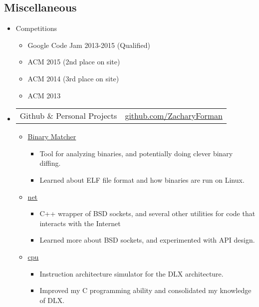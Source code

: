 \documentclass[10pt,letterpaper]{article}
\makeatletter
\newcommand{\headerrow}[2]
{\begin{tabular*}{\linewidth}{l@{\extracolsep{\fill}}r}
  #1 &
  #2 \\
\end{tabular*}}
\makeatother
\begin{document}
\subsection*{Miscellaneous}
\begin{itemize}
  \item Competitions
    \begin{itemize}
      \item Google Code Jam 2013-2015 (Qualified)
      \item ACM 2015 (2nd place on site)
      \item ACM 2014 (3rd place on site)
      \item ACM 2013
    \end{itemize}
  \item
  \headerrow
    {Github \& Personal Projects}
    {\href{https://www.github.com/ZacharyForman}{github.com/ZacharyForman}}
    \begin{itemize}
      \item \href{https://github.com/ZacharyForman/Binary_Matcher}{Binary Matcher}
        \begin{itemize}
          \item Tool for analyzing binaries, and potentially doing clever
                binary diffing.
          \item Learned about ELF file format and how binaries are run on Linux.
        \end{itemize}
      \item \href{https://github.com/ZacharyForman/net}{net}
        \begin{itemize}
          \item C++ wrapper of BSD sockets, and several other utilities for
                code that interacts with the Internet
          \item Learned more about BSD sockets, and experimented with API
                design.
        \end{itemize}
      \item \href{https://github.com/ZacharyForman/cpu}{cpu}
        \begin{itemize}
          \item Instruction architecture simulator for the DLX architecture.
          \item Improved my C programming ability and consolidated my knowledge
                of DLX.
        \end{itemize}
    \end{itemize}
  \end{itemize}
\end{document}
